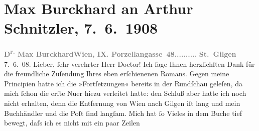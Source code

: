 

         
         \renewcommand{\erwaehntePersonen}{Personen: Max Eugen Burckhard, Olga Schnitzler}
         \renewcommand{\erwaehnteOrte}{Orte: Porzellangasse, St. Gilgen, Wien}
         \renewcommand{\erwaehnteWerke}{Werke: Der Weg ins Freie. Roman, Die neue Rundschau}
               \section[Max Burckhard an Arthur Schnitzler, 7. 6. 1908]{ Max Burckhard an Arthur Schnitzler, 7. 6. 1908}\nopagebreak{}\rehead{ }\begin{ledgroupsized}[t]{13cm}\normalsize\beginnumbering \toendnotes[C]{\smallbreak\pagebreak[2]} 
\toendnotes[C]{\smallbreak}\pstart
           \noindent{}{\pb}\textcolor{gray}{\textbf{D\textsuperscript{r.} Max Burckhard}}\hfill \textcolor{gray}{\textbf{Wien, IX. Porzellangasse 48..........}}\pend
           \pstart
           \raggedleft{}\textcolor{gray}{\textbf{St. Gilgen}}{ }7. 6. 08.\pend
           \pstart{}Lieber, ſehr verehrter Herr Doctor!\pend\pstart
           Ich ſage Ihnen herzlichſten Dank für die freundliche Zuſendung Ihres eben
               erſchienenen Romans. Gegen
               meine Principien hatte ich die »Fortſetzungen« bereits in der Rundſchau geleſen, da mich ſchon die erſte Nu{\geminationm}er hiezu verleitet hatte: den Schluß aber hatte ich
               noch nicht erhalten, denn die Entfernung von Wien
               nach Gilgen iſt lang und mein Buchhändler und die
               Poſt ſind langſam. Mich hat ſo Vieles in dem Buche tief bewegt, daſs ich es nicht mit ein paar Zeilen

\end{ledgroupsized}
